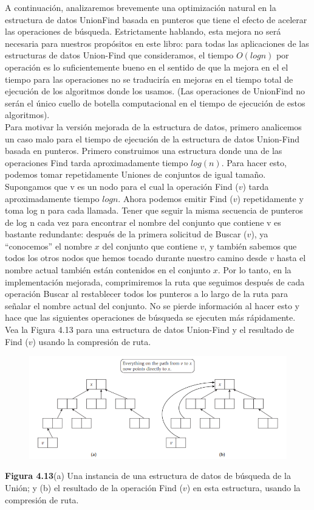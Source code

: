 \documentclass[a4paper, 12pt]{book}
\theoremstyle{dotless}
\begin{document}
A continuación, analizaremos brevemente una optimización natural en la estructura de datos UnionFind basada en punteros que tiene el efecto de acelerar las operaciones de búsqueda. Estrictamente hablando, esta mejora no será necesaria para nuestros propósitos en este libro: para todas las aplicaciones de las estructuras de datos Union-Find que consideramos, el tiempo $O(log n)$ por operación es lo suficientemente bueno en el sentido de que la mejora en el el tiempo para las operaciones no se traduciría en mejoras en el tiempo total de ejecución de los algoritmos donde los usamos. (Las operaciones de UnionFind no serán el único cuello de botella computacional en el tiempo de ejecución de estos algoritmos).\\

Para motivar la versión mejorada de la estructura de datos, primero analicemos un caso malo para el tiempo de ejecución de la estructura de datos Union-Find basada en punteros. Primero construimos una estructura donde una de las operaciones Find tarda aproximadamente tiempo $log(n)$. Para hacer esto, podemos tomar repetidamente Uniones de conjuntos de igual tamaño. Supongamos que v es un nodo para el cual la operación Find ($v$) tarda aproximadamente tiempo $log n$. Ahora podemos emitir Find ($v$) repetidamente y toma log n para cada llamada. Tener que seguir la misma secuencia de punteros de log n cada vez para encontrar el nombre del conjunto que contiene v es bastante redundante: después de la primera solicitud de Buscar ($v$), ya ``conocemos'' el nombre $x$ del conjunto que contiene $v$, y también sabemos que todos los otros nodos que hemos tocado durante nuestro camino desde $v$ hasta el nombre actual también están contenidos en el conjunto $x$. Por lo tanto, en la implementación mejorada, comprimiremos la ruta que seguimos después de cada operación Buscar al restablecer todos los punteros a lo largo de la ruta para señalar el nombre actual del conjunto. No se pierde información al hacer esto y hace que las siguientes operaciones de búsqueda se ejecuten más rápidamente. Vea la Figura 4.13 para una estructura de datos Union-Find y el resultado de Find ($v$) usando la compresión de ruta.\\


\begin{figure}[h]
\centering
\includegraphics[scale=0.9]{Imagenes-Seccion4/fig4_13.PNG}
\end{figure}
\textbf{Figura 4.13}(a) Una instancia de una estructura de datos de búsqueda de la Unión; y (b) el resultado de la operación Find ($v$) en esta estructura, usando la compresión de ruta.\\
\end{document}
